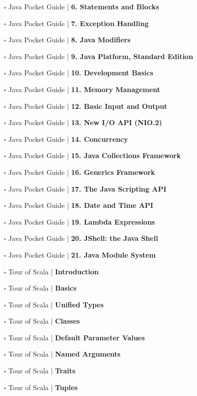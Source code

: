 \documentclass[a4, landscape, 12pt]{article}
\newcommand{\checkbox}{$\square$}%
\begin{document}
\begin{itemize}
{}
\item [\checkbox]  Java Pocket Guide  | \textbf{ 6. Statements and Blocks
}
\item [\checkbox]  Java Pocket Guide  | \textbf{ 7. Exception Handling
}
\item [\checkbox]  Java Pocket Guide  | \textbf{ 8. Java Modifiers
}
\item [\checkbox]  Java Pocket Guide  | \textbf{ 9. Java Platform, Standard Edition
}
\item [\checkbox]  Java Pocket Guide  | \textbf{ 10. Development Basics
}
\item [\checkbox]  Java Pocket Guide  | \textbf{ 11. Memory Management
}
\item [\checkbox]  Java Pocket Guide  | \textbf{ 12. Basic Input and Output
}
\item [\checkbox]  Java Pocket Guide  | \textbf{ 13. New I/O API (NIO.2)
}
\item [\checkbox]  Java Pocket Guide  | \textbf{ 14. Concurrency
}
\item [\checkbox]  Java Pocket Guide  | \textbf{ 15. Java Collections Framework
}
\item [\checkbox]  Java Pocket Guide  | \textbf{ 16. Generics Framework
}
\item [\checkbox]  Java Pocket Guide  | \textbf{ 17. The Java Scripting API
}
\item [\checkbox]  Java Pocket Guide  | \textbf{ 18. Date and Time API
}
\item [\checkbox]  Java Pocket Guide  | \textbf{ 19. Lambda Expressions
}
\item [\checkbox]  Java Pocket Guide  | \textbf{ 20. JShell: the Java Shell
}
\item [\checkbox]  Java Pocket Guide  | \textbf{ 21. Java Module System
}
\item [\checkbox]  Tour of Scala  | \textbf{ Introduction
}
\item [\checkbox]  Tour of Scala  | \textbf{ Basics
}
\item [\checkbox]  Tour of Scala  | \textbf{ Unified Types
}
\item [\checkbox]  Tour of Scala  | \textbf{ Classes
}
\item [\checkbox]  Tour of Scala  | \textbf{ Default Parameter Values
}
\item [\checkbox]  Tour of Scala  | \textbf{ Named Arguments
}
\item [\checkbox]  Tour of Scala  | \textbf{ Traits
}
\item [\checkbox]  Tour of Scala  | \textbf{ Tuples
}
\end{itemize}
\end{document}

